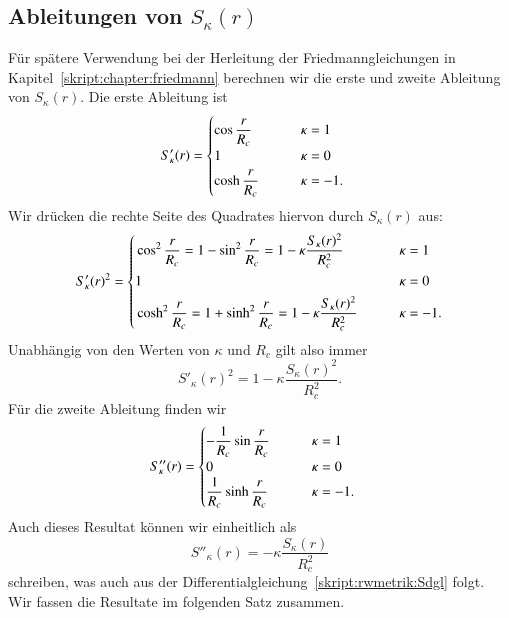 \subsection{Ableitungen von $S_\kappa(r)$}
Für spätere Verwendung bei der Herleitung der Friedmanngleichungen
in Kapitel~\ref{skript:chapter:friedmann}
berechnen wir die erste und zweite Ableitung 
von $S_\kappa(r)$.
Die erste Ableitung ist
\begin{align*}
S'_\kappa(r)
&=
\begin{cases}
\cos \displaystyle\frac{\mathstrut r}{R_c}&\qquad \kappa= 1\\
1                                         &\qquad \kappa= 0\\
\cosh\displaystyle\frac{\mathstrut r}{R_c}&\qquad \kappa=-1.
\end{cases}
\end{align*}
Wir drücken die rechte Seite des Quadrates hiervon durch $S_\kappa(r)$ aus:
\begin{equation}
S'_\kappa(r)^2
=
\left\{
\begin{aligned}
&\cos^2\displaystyle\frac{\mathstrut r}{R_c}
=
1-\sin^2\displaystyle\frac{\mathstrut r}{R_c}
=
1-\kappa \frac{S_\kappa(r)^2}{R_c^2}&&\qquad\kappa=1\\
&1&&\qquad\kappa=0\\
&\cosh^2\displaystyle\frac{\mathstrut r}{R_c}
=
1+\sinh^2\displaystyle\frac{\mathstrut r}{R_c}
=
1-\kappa \frac{S_\kappa(r)^2}{R_c^2}&&\qquad\kappa=-1.
\end{aligned}
\right.
\end{equation}
Unabhängig von den Werten von $\kappa$ und $R_c$ gilt also immer
\begin{equation}
S'_\kappa(r)^2 = 1-\kappa \frac{S_\kappa(r)^2}{R_c^2}.
\label{skript:robertson:ersteableitung}
\end{equation}
Für die zweite Ableitung finden wir
\begin{align*}
S''_\kappa(r)
&=
\begin{cases}
\displaystyle-\frac{1}{R_c}\sin \frac{\mathstrut r}{R_c}&\qquad \kappa= 1\\
0                                                       &\qquad \kappa= 0\\
\displaystyle \frac{1}{R_c}\sinh\frac{\mathstrut r}{R_c}&\qquad \kappa=-1.
\end{cases}
\end{align*}
Auch dieses Resultat können wir einheitlich als
\begin{equation}
S''_\kappa(r)
=
-\kappa\displaystyle \frac{S_\kappa(r)}{R_c^2}
\label{skript:robertson:zweiteableitung}
\end{equation}
schreiben, was auch aus der Differentialgleichung~\eqref{skript:rwmetrik:Sdgl}
folgt.
Wir fassen die Resultate im folgenden Satz zusammen.

